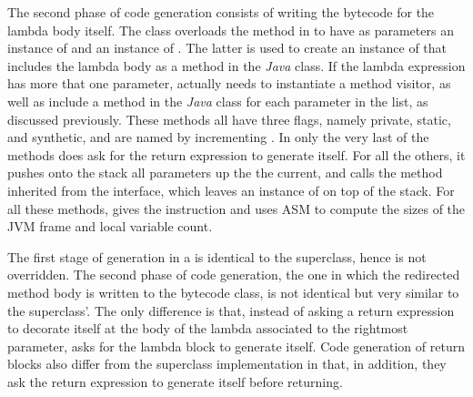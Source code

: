 The second phase of code generation consists of writing the bytecode for the lambda body itself. The  class overloads the  method in  to have as parameters an instance of  and an instance of . The latter is used to create an instance of  that includes the lambda body as a method in the \emph{Java} class. If the lambda expression has more that one parameter,  actually needs to instantiate a method visitor, as well as include a method in the \emph{Java} class for each parameter in the list, as discussed previously. These methods all have three flags, namely private, static, and synthetic, and are named by incrementing . In only the very last of the methods does  ask for the return expression to generate itself. For all the others, it pushes onto the stack all parameters up the the current, and calls the  method inherited from the  interface, which leaves an instance of  on top of the stack. For all these methods,  gives the  instruction and uses ASM to compute the sizes of the JVM frame and local variable count.

The first stage of generation in a  is identical to the  superclass, hence is not overridden. The second phase of code generation, the one in which the redirected method body is written to the bytecode class, is not identical but very similar to the superclass'. The only difference is that, instead of asking a return expression to decorate itself at the body of the lambda associated to the rightmost parameter,  asks for the lambda block to generate itself. Code generation of return blocks also differ from the superclass implementation in that, in addition, they ask the return expression to generate itself before returning.

